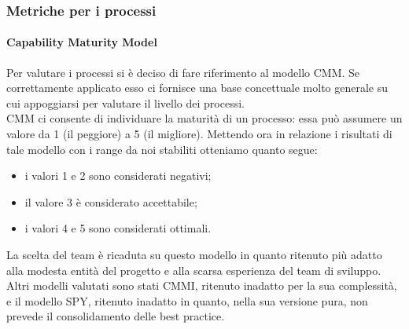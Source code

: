			\subsubsection{Metriche per i processi}
				\paragraph{Capability Maturity Model}
					Per valutare i processi si è deciso di fare riferimento al modello CMM. Se correttamente applicato esso ci fornisce una base 
					concettuale molto generale su cui appoggiarsi per valutare il livello dei processi.\\
					CMM ci consente di individuare la maturità di un processo: essa può assumere un valore da 1 (il peggiore) a 5 (il migliore). Mettendo 
					ora in relazione i risultati di tale modello con i range da noi stabiliti otteniamo quanto segue:
					\begin{itemize}
						\item i valori 1 e 2 sono considerati negativi;
						\item il valore 3 è considerato accettabile;
						\item i valori 4 e 5 sono considerati ottimali.
					\end{itemize}
					La scelta del team è ricaduta su questo modello in quanto ritenuto più adatto alla modesta entità del progetto e alla scarsa esperienza del 
					team di sviluppo. Altri modelli valutati sono stati CMMI, ritenuto inadatto per la sua complessità, e il modello SPY, ritenuto inadatto in 
					quanto, nella sua versione pura, non prevede il consolidamento delle best practice.
